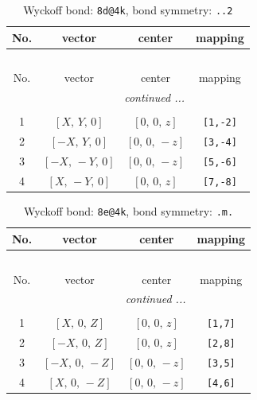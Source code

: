 \documentclass[fleqn,8pt]{jsarticle}
\begin{document}
\begin{longtable}{cccc}
\caption{Wyckoff bond: {\tt 8d@4k}, bond symmetry: {\tt ..2}}
 \\
 \hline \hline
No. & vector & center & mapping \\ \hline \endfirsthead

\multicolumn{3}{l}{\tablename\ \thetable{}} \\
 \hline \hline
No. & vector & center & mapping \\ \hline \endhead

 \hline \hline
\multicolumn{3}{r}{\footnotesize\it continued ...} \\ \endfoot

 \hline \hline
\multicolumn{3}{r}{} \\ \endlastfoot

1 & $\left[ X,\, Y,\, 0 \right]$ & $\left[ 0,\, 0,\, z \right]$ & {\tt [1,-2]} \\ \hline
2 & $\left[ - X,\, Y,\, 0 \right]$ & $\left[ 0,\, 0,\, - z \right]$ & {\tt [3,-4]} \\ \hline
3 & $\left[ - X,\, - Y,\, 0 \right]$ & $\left[ 0,\, 0,\, - z \right]$ & {\tt [5,-6]} \\ \hline
4 & $\left[ X,\, - Y,\, 0 \right]$ & $\left[ 0,\, 0,\, z \right]$ & {\tt [7,-8]} \\
\end{longtable}
\renewcommand{\arraystretch}{1.2}
\begin{longtable}{cccc}
\caption{Wyckoff bond: {\tt 8e@4k}, bond symmetry: {\tt .m.}}
 \\
 \hline \hline
No. & vector & center & mapping \\ \hline \endfirsthead

\multicolumn{3}{l}{\tablename\ \thetable{}} \\
 \hline \hline
No. & vector & center & mapping \\ \hline \endhead

 \hline \hline
\multicolumn{3}{r}{\footnotesize\it continued ...} \\ \endfoot

 \hline \hline
\multicolumn{3}{r}{} \\ \endlastfoot

1 & $\left[ X,\, 0,\, Z \right]$ & $\left[ 0,\, 0,\, z \right]$ & {\tt [1,7]} \\ \hline
2 & $\left[ - X,\, 0,\, Z \right]$ & $\left[ 0,\, 0,\, z \right]$ & {\tt [2,8]} \\ \hline
3 & $\left[ - X,\, 0,\, - Z \right]$ & $\left[ 0,\, 0,\, - z \right]$ & {\tt [3,5]} \\ \hline
4 & $\left[ X,\, 0,\, - Z \right]$ & $\left[ 0,\, 0,\, - z \right]$ & {\tt [4,6]} \\
\end{longtable}
\end{document}
